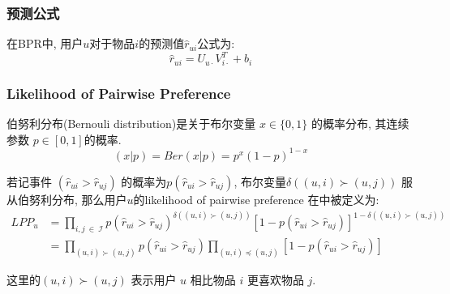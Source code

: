 \subsubsection{预测公式}

在BPR中, 用户$u$对于物品$i$的预测值$\hat{r}_{ui}$公式为:
\begin{equation}
\hat{r}_{ui} = U_{u\cdot}V_{i\cdot}^T + b_i
\end{equation}


\subsubsection{Likelihood of Pairwise Preference}

伯努利分布(Bernouli distribution)是关于布尔变量 $x \in \{0,1\}$ 的概率分布, 其连续参数 $p \in \left[0,1\right]$的概率.
\begin{equation}
\left( x|p \right) = Ber\left(x|p \right)=p^x\left(1-p \right)^{1-x}
\end{equation}

若记事件 $\left(\hat{r}_{ui} > \hat{r}_{uj}\right)$ 的概率为$p\left(\hat{r}_{ui} > \hat{r}_{uj}\right)$, 布尔变量$\delta\left(\left(u,i\right) \succ \left(u,j\right)\right)$ 服从伯努利分布, 那么用户$u$的likelihood of pairwise preference 在中被定义为:
\begin{equation}
\label{LPP}
\begin{aligned}
LPP_u  
&= \prod_{i,j \ \in \  \mathcal{I}}p\left(\hat{r}_{ui} > \hat{r}_{uj}\right)^{\delta\left(\left(u,i\right) \succ \left(u,j\right)\right)} \left[1-p\left(\hat{r}_{ui} > \hat{r}_{uj}\right)\right]^{1-\delta\left(\left(u,i\right) \succ \left(u,j\right)\right)}\\
&= \prod_{\left(u,i\right) \succ \left(u,j\right)}p\left(\hat{r}_{ui} > \hat{r}_{uj}\right)\prod_{\left(u,i\right) \preceq \left(u,j\right)}\left[1-p\left(\hat{r}_{ui} > \hat{r}_{uj}\right)\right]
\end{aligned}
\end{equation}

这里的$\left(u,i\right) \succ \left(u,j\right)$ 表示用户 $u$ 相比物品 $i$ 更喜欢物品 $j$.


